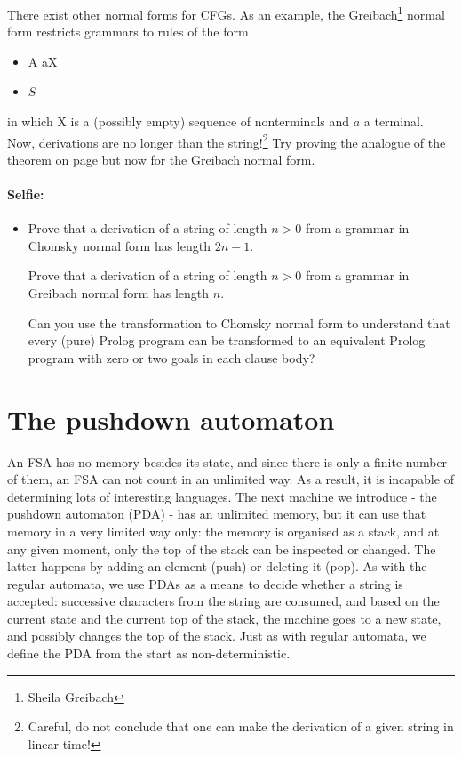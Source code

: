 There exist other normal forms for CFGs. As an example, the
Greibach\footnote{Sheila Greibach} normal form restricts grammars to
rules of the form
\begin{itemize}
\item A \rpijl aX
\item $S$ \rpijl \eps
\end{itemize}
in which X is a (possibly empty) sequence of nonterminals and $a$ a
terminal. Now, derivations are no longer than the
string!\footnote{Careful, do not conclude that one can make the
  derivation of a given string in linear time!} Try proving the
analogue of the theorem on page \pageref{chomskynormalform} but now
for the Greibach normal form.

\paragraph{Selfie:}
\begin{itemize}
\item[]
Prove that a derivation of a string of length $n > 0$ from a grammar
in Chomsky normal form has length $2n-1$.

Prove that a derivation of a string of length $n > 0$ from a grammar
in Greibach normal form has length $n$.

Can you use the transformation to Chomsky normal form to understand
that every (pure) Prolog program can be transformed to an equivalent
Prolog program with zero or two goals in each clause body?
\end{itemize}


\clearpage
\section{The pushdown automaton}

An FSA has no memory besides its state, and since there is only a
finite number of them, an FSA can not count in an unlimited way. As a
result, it is incapable of determining lots of interesting
languages. The next machine we introduce - the pushdown automaton
(PDA) - has an unlimited memory, but it can use that memory in a very
limited way only: the memory is organised as a stack, and at any given
moment, only the top of the stack can be inspected or changed. The
latter happens by adding an element (push) or deleting it (pop).
As with the regular automata, we use PDAs as a means to decide whether
a string is accepted: successive characters from the string are
consumed, and based on the current state and the current top of the
stack, the machine goes to a new state, and possibly changes the top
of the stack. Just as with regular automata, we define the PDA from
the start as non-deterministic.


